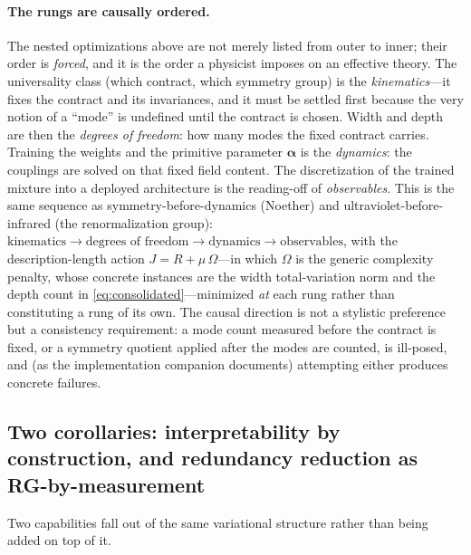 \documentclass[11pt]{article}
\theoremstyle{definition}
\newcommand{\alphapar}{\bm{\alpha}}
\begin{document}
\paragraph{The rungs are causally ordered.} The nested optimizations above are not merely
listed from outer to inner; their order is \emph{forced}, and it is the order a physicist
imposes on an effective theory. The universality class (which contract, which symmetry group)
is the \emph{kinematics}---it fixes the contract and its invariances, and it must be settled first
because the very notion of a ``mode'' is undefined until the contract is chosen. Width and depth
are then the \emph{degrees of freedom}: how many modes the fixed contract carries. Training the
weights and the primitive parameter $\alphapar$ is the \emph{dynamics}: the couplings are solved
on that fixed field content. The discretization of the trained mixture into a deployed
architecture is the reading-off of \emph{observables}. This is the same sequence as
symmetry-before-dynamics (Noether) and ultraviolet-before-infrared (the renormalization group):
$\text{kinematics}\to\text{degrees of freedom}\to\text{dynamics}\to\text{observables}$, with the
description-length action $J=R+\mu\,\Omega$---in which $\Omega$ is the generic complexity penalty, whose
concrete instances are the width total-variation norm and the depth count in
\eqref{eq:consolidated}---minimized \emph{at} each rung rather than constituting
a rung of its own. The causal direction is not a stylistic preference but a consistency
requirement: a mode count measured before the contract is fixed, or a symmetry quotient applied after
the modes are counted, is ill-posed, and (as the implementation companion documents) attempting
either produces concrete failures.

\subsection{Two corollaries: interpretability by construction, and redundancy reduction as RG-by-measurement}
\label{sec:corollaries}
Two capabilities fall out of the same variational structure rather than being added on top of it.
\end{document}
